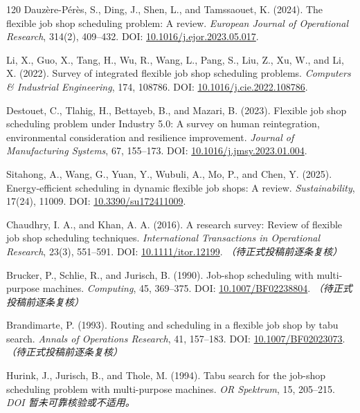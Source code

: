\documentclass[UTF8,a4paper,11pt]{ctexart}
\begin{document}
\begin{thebibliography}{120}
Dauz\`ere-P\'er\`es, S., Ding, J., Shen, L., and Tamssaouet, K. (2024). The flexible job shop scheduling problem: A review. \emph{European Journal of Operational Research}, 314(2), 409--432.
\newblock DOI: \href{https://doi.org/10.1016/j.ejor.2023.05.017}{10.1016/j.ejor.2023.05.017}.

Li, X., Guo, X., Tang, H., Wu, R., Wang, L., Pang, S., Liu, Z., Xu, W., and Li, X. (2022). Survey of integrated flexible job shop scheduling problems. \emph{Computers \& Industrial Engineering}, 174, 108786.
\newblock DOI: \href{https://doi.org/10.1016/j.cie.2022.108786}{10.1016/j.cie.2022.108786}.

Destouet, C., Tlahig, H., Bettayeb, B., and Mazari, B. (2023). Flexible job shop scheduling problem under Industry 5.0: A survey on human reintegration, environmental consideration and resilience improvement. \emph{Journal of Manufacturing Systems}, 67, 155--173.
\newblock DOI: \href{https://doi.org/10.1016/j.jmsy.2023.01.004}{10.1016/j.jmsy.2023.01.004}.

Sitahong, A., Wang, G., Yuan, Y., Wubuli, A., Mo, P., and Chen, Y. (2025). Energy-efficient scheduling in dynamic flexible job shops: A review. \emph{Sustainability}, 17(24), 11009.
\newblock DOI: \href{https://doi.org/10.3390/su172411009}{10.3390/su172411009}.

Chaudhry, I. A., and Khan, A. A. (2016). A research survey: Review of flexible job shop scheduling techniques. \emph{International Transactions in Operational Research}, 23(3), 551--591.
\newblock DOI: \href{https://doi.org/10.1111/itor.12199}{10.1111/itor.12199}. \textit{（待正式投稿前逐条复核）}

Brucker, P., Schlie, R., and Jurisch, B. (1990). Job-shop scheduling with multi-purpose machines. \emph{Computing}, 45, 369--375.
\newblock DOI: \href{https://doi.org/10.1007/BF02238804}{10.1007/BF02238804}. \textit{（待正式投稿前逐条复核）}

Brandimarte, P. (1993). Routing and scheduling in a flexible job shop by tabu search. \emph{Annals of Operations Research}, 41, 157--183.
\newblock DOI: \href{https://doi.org/10.1007/BF02023073}{10.1007/BF02023073}. \textit{（待正式投稿前逐条复核）}

Hurink, J., Jurisch, B., and Thole, M. (1994). Tabu search for the job-shop scheduling problem with multi-purpose machines. \emph{OR Spektrum}, 15, 205--215.
\newblock \textit{DOI 暂未可靠核验或不适用。}


\end{thebibliography}
\end{document}
